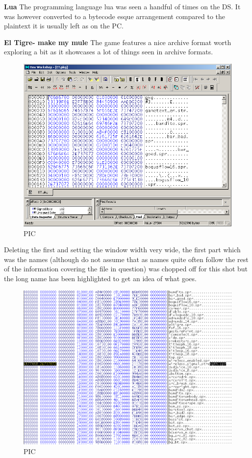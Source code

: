 \documentclass[
]{book}
\begin{document}
\textbf{Lua} The programming language lua was seen a handful of times on the DS. It was however converted to a bytecode esque arrangement compared to the plaintext it is usually left as on the PC.

\textbf{El Tigre- make my mule} The game features a nice archive format worth exploring a bit as it showcases a lot of things seen in archive formats.

\begin{figure}
\centering
\includegraphics{images/127_home_fast6191_romhackingguide_unrenamed_fil___al_borders_romhackingguidearchive_eltigre_1.png}
\caption{PIC}
\end{figure}

Deleting the first and setting the window width very wide, the first part which was the names (although do not assume that as names quite often follow the rest of the information covering the file in question) was chopped off for this shot but the long name has been highlighted to get an idea of what goes.

\begin{figure}
\centering
\includegraphics{images/128_home_fast6191_romhackingguide_unrenamed_fil___al_borders_romhackingguidearchive_eltigre_2.png}
\caption{PIC}
\end{figure}
\end{document}
